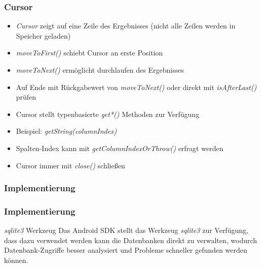 \begin{frame}
   \frametitle{Cursor}
   \begin{itemize}
   	\item \emph{Cursor} zeigt auf eine Zeile des Ergebnisses (nicht alle 
   		Zeilen werden in Speicher geladen)
   	\item \emph{moveToFirst()} schiebt Cursor an erste Position
   	\item \emph{moveToNext()} ermöglicht durchlaufen des Ergebnisses
   	\item Auf Ende mit Rückgabewert von \emph{moveToNext()} oder 
			direkt mit \emph{isAfterLast()} prüfen
   	\item Cursor stellt typenbasierte \emph{get*()} Methoden zur Verfügung
   	\item Beispiel: \emph{getString(columnIndex)}
   	\item Spalten-Index kann mit \emph{getColumnIndexOrThrow()} 
   		erfragt werden
   	\item Cursor immer mit \emph{close()} schließen
   \end{itemize}
\end{frame}

\begin{frame}
   \frametitle{Implementierung}
	
\end{frame}

\begin{frame}
   \frametitle{Implementierung}
   \begin{alertblock}{\emph{sqlite3} Werkzeug}
		Das Android SDK stellt das Werkzeug \emph{sqlite3} zur Verfügung, dass dazu verwendet 
		werden kann die Datenbanken direkt zu verwalten, wodurch Datenbank-Zugriffe 
		besser analysiert und Probleme schneller gefunden werden können.
	\end{alertblock}
\end{frame}



